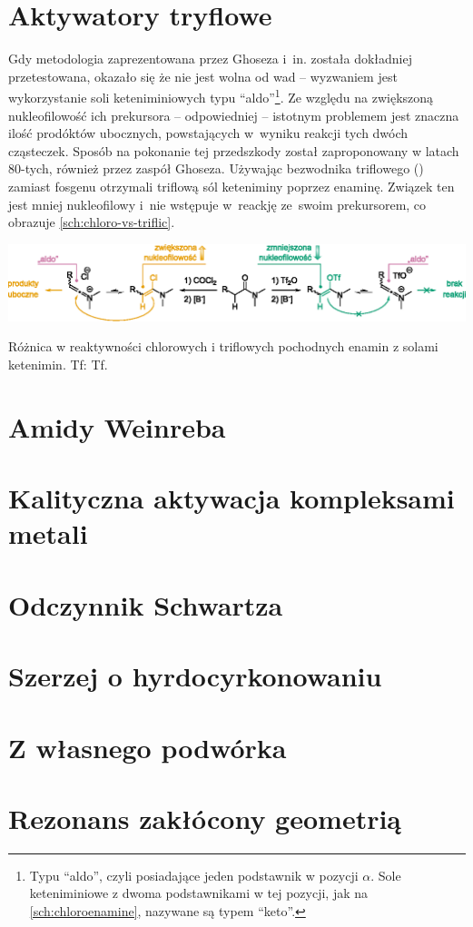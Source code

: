 \section{Aktywatory tryflowe}
Gdy metodologia zaprezentowana przez Ghoseza i~in. została dokładniej przetestowana, okazało się że nie jest wolna od wad \---
wyzwaniem jest wykorzystanie soli keteniminiowych typu \enquote{aldo}\footnote{%
  Typu \enquote{aldo}, czyli posiadające jeden podstawnik w pozycji $\alpha$.
  Sole keteniminiowe z dwoma podstawnikami w tej pozycji, jak na \cref{sch:chloroenamine}, nazywane są typem \enquote{keto}.
}. Ze względu na zwiększoną nukleofilowość ich prekursora \--- odpowiedniej  \---
istotnym problemem jest znaczna ilość prodóktów ubocznych, powstających w~wyniku reakcji tych dwóch cząsteczek.
Sposób na pokonanie tej przedszkody został zaproponowany w latach 80-tych, również przez zaspół Ghoseza.
Używając bezwodnika triflowego () zamiast fosgenu otrzymali triflową sól keteniminy poprzez  enaminę.\autocite{ghosez81}
Związek ten jest mniej nukleofilowy i~nie wstępuje w~reackję ze~swoim prekursorem, co obrazuje \cref{sch:chloro-vs-triflic}.
\begin{scheme*}
  \centering
  \includegraphics{schemes/chloro-vs-triflic}
  \caption{Różnica w reaktywności chlorowych i triflowych pochodnych enamin z solami ketenimin. \acrshort{Tf}: \acrlong{Tf}.}
  \label{sch:chloro-vs-triflic}
\end{scheme*}

\section{Amidy Weinreba}


\section{Kalityczna aktywacja kompleksami metali}

\section{Odczynnik Schwartza}

\section{Szerzej o hyrdocyrkonowaniu}

\section{Z własnego podwórka}

\section{Rezonans zakłócony geometrią}